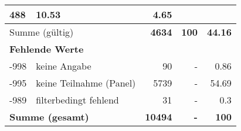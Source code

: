 \begin{longtable}{lXrrr}
       \num{488} &
       \num[round-mode=places,round-precision=2]{10.53} &
         \num[round-mode=places,round-precision=2]{4.65} \\
     \midrule
     \multicolumn{2}{l}{Summe (gültig)} &
       \textbf{\num{4634}} &
     \textbf{\num{100}} &
       \textbf{\num[round-mode=places,round-precision=2]{44.16}} \\
     \multicolumn{5}{l}{\textbf{Fehlende Werte}}\\
       -998 &
       keine Angabe &
         \num{90} &
        - &
         \num[round-mode=places,round-precision=2]{0.86} \\
       -995 &
       keine Teilnahme (Panel) &
         \num{5739} &
        - &
         \num[round-mode=places,round-precision=2]{54.69} \\
       -989 &
       filterbedingt fehlend &
         \num{31} &
        - &
         \num[round-mode=places,round-precision=2]{0.3} \\
     \midrule
     \multicolumn{2}{l}{\textbf{Summe (gesamt)}} &
          \textbf{\num{10494}} &
        \textbf{-} &
        \textbf{\num{100}} \\
     \bottomrule
     \end{longtable}
     
